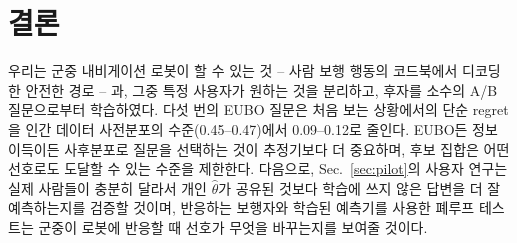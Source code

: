 \section{결론}
\label{sec:conclusion}
우리는 군중 내비게이션 로봇이 할 수 있는 것 -- 사람 보행 행동의 코드북에서 디코딩한 안전한 경로 -- 과, 그중 특정 사용자가
원하는 것을 분리하고, 후자를 소수의 A/B 질문으로부터 학습하였다. 다섯 번의 EUBO 질문은 처음 보는 상황에서의 단순 regret을
인간 데이터 사전분포의 수준(0.45--0.47)에서 0.09--0.12로 줄인다. EUBO든 정보 이득이든 사후분포로 질문을 선택하는 것이 추정기보다 더 중요하며, 후보 집합은
어떤 선호로도 도달할 수 있는 수준을 제한한다. 다음으로, Sec.~\ref{sec:pilot}의 사용자 연구는 실제 사람들이 충분히 달라서
개인 $\hat\theta$가 공유된 것보다 학습에 쓰지 않은 답변을 더 잘 예측하는지를 검증할 것이며, 반응하는 보행자와 학습된
예측기를 사용한 폐루프 테스트는 군중이 로봇에 반응할 때 선호가 무엇을 바꾸는지를 보여줄 것이다.
